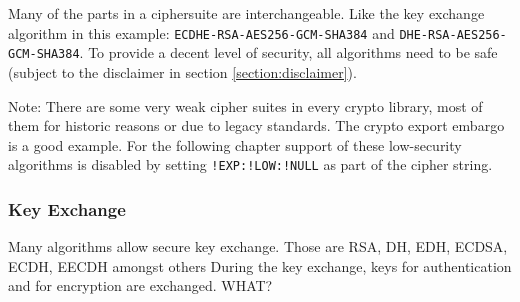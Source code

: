 


Many of the parts in a ciphersuite are interchangeable. Like the key exchange
algorithm in this example: \texttt{ECDHE-RSA-AES256-GCM-SHA384} and
\texttt{DHE-RSA-AES256-GCM-SHA384}.  To provide a decent level of security, all
algorithms need to be safe (subject to the disclaimer in section
\ref{section:disclaimer}).

Note: There are some very weak cipher suites in every crypto library, most of
them for historic reasons or due to legacy standards. The crypto export embargo
is a good example\cite{Wikipedia:ExportCipher}.  For the following chapter
support of these low-security algorithms is disabled by setting
\texttt{!EXP:!LOW:!NULL} as part of the cipher string.


\subsubsection{Key Exchange}

Many algorithms allow secure key exchange.  Those are RSA, DH, EDH, ECDSA,
ECDH, EECDH amongst others During the key exchange, keys for authentication and
for encryption are exchanged. %
WHAT?


